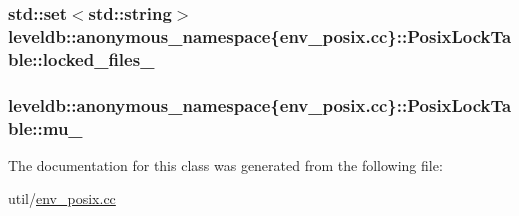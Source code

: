 \subsubsection[{locked\+\_\+files\+\_\+}]{\setlength{\rightskip}{0pt plus 5cm}std\+::set$<$std\+::string$>$ leveldb\+::anonymous\+\_\+namespace\{env\+\_\+posix.\+cc\}\+::Posix\+Lock\+Table\+::locked\+\_\+files\+\_\+\hspace{0.3cm}{\ttfamily [private]}}\label{classleveldb_1_1anonymous__namespace_02env__posix_8cc_03_1_1_posix_lock_table_ac0c613101281444eb216a6c2cd045f9f}
\hypertarget{classleveldb_1_1anonymous__namespace_02env__posix_8cc_03_1_1_posix_lock_table_add436c8922d47630043e2e8857673848}{}
\subsubsection[{mu\+\_\+}]{ leveldb\+::anonymous\+\_\+namespace\{env\+\_\+posix.\+cc\}\+::Posix\+Lock\+Table\+::mu\+\_\+\hspace{0.3cm}{\ttfamily [private]}}\label{classleveldb_1_1anonymous__namespace_02env__posix_8cc_03_1_1_posix_lock_table_add436c8922d47630043e2e8857673848}


The documentation for this class was generated from the following file\+:\begin{DoxyCompactItemize}
\item 
util/\hyperlink{env__posix_8cc}{env\+\_\+posix.\+cc}\end{DoxyCompactItemize}
